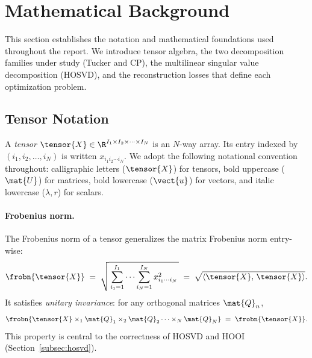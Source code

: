 
\section{Mathematical Background}
\label{sec:background}

This section establishes the notation and mathematical foundations used
throughout the report.
We introduce tensor algebra, the two decomposition families under study
(Tucker and CP), the multilinear singular value decomposition (HOSVD),
and the reconstruction losses that define each optimization problem.

\subsection{Tensor Notation}
\label{subsec:notation}

A \emph{tensor} $\tensor{X} \in \R^{I_1 \times I_2 \times \cdots \times I_N}$
is an $N$-way array.
Its entry indexed by $(i_1, i_2, \ldots, i_N)$ is written $x_{i_1 i_2 \cdots i_N}$.
We adopt the following notational convention throughout:
calligraphic letters ($\tensor{X}$) for tensors,
bold uppercase ($\mat{U}$) for matrices,
bold lowercase ($\vect{u}$) for vectors,
and italic lowercase ($\lambda, r$) for scalars.

\paragraph{Frobenius norm.}
The Frobenius norm of a tensor generalizes the matrix Frobenius norm
entry-wise:
\begin{equation}
  \frobn{\tensor{X}}
  \;=\; \sqrt{\,\sum_{i_1=1}^{I_1} \cdots \sum_{i_N=1}^{I_N}
               x_{i_1 \cdots i_N}^2\,}
  \;=\; \sqrt{\langle \tensor{X},\, \tensor{X} \rangle}.
  \label{eq:frobenius}
\end{equation}
It satisfies \emph{unitary invariance}: for any orthogonal matrices
$\mat{Q}_n$,
\begin{equation}
  \frobn{\tensor{X} \times_1 \mat{Q}_1 \times_2 \mat{Q}_2 \cdots
         \times_N \mat{Q}_N}
  \;=\; \frobn{\tensor{X}}.
  \label{eq:unitary_inv}
\end{equation}
This property is central to the correctness of HOSVD and HOOI
(Section~\ref{subsec:hosvd}).

